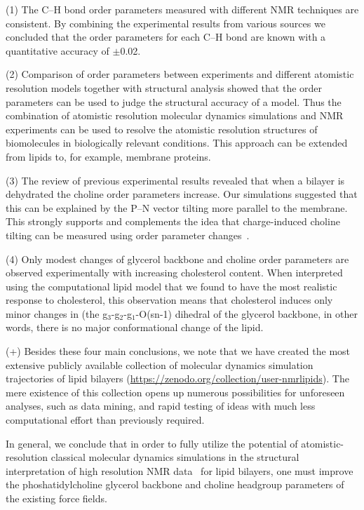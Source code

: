 \documentclass[journal=jacsat,manuscript=article]{achemso}
\begin{document}
(1) The C--H bond order parameters measured with different NMR techniques are consistent.
By combining the experimental results from various sources we concluded
that the order parameters for each C--H bond are known with a quantitative accuracy of $\pm$0.02.

(2) Comparison of order parameters between experiments and different atomistic resolution models 
together with structural analysis showed that the order parameters can be used
to judge the structural accuracy of a model. Thus the combination of atomistic resolution 
molecular dynamics simulations and NMR experiments can be used to resolve the atomistic resolution
structures of biomolecules in biologically relevant conditions. 
This approach can be extended from lipids to, for example, membrane proteins.

(3) The review of previous experimental results revealed that when a bilayer is dehydrated the 
choline order parameters increase. Our simulations suggested that
this can be explained by the P--N vector tilting more parallel to the membrane. 
This strongly supports and complements the idea that charge-induced choline tilting
can be measured using order parameter changes~\cite{ionpaper,scherer89}.

(4) Only modest changes of glycerol backbone and choline order parameters are observed experimentally with increasing cholesterol content.
When interpreted using the computational lipid model that we found to have the most realistic response to cholesterol,
this observation means that cholesterol induces only minor changes in (the g$_3$-g$_2$-g$_1$-O(sn-1)
dihedral of the glycerol backbone, in other words, there is no major conformational change of the lipid.

(+) Besides these four main conclusions, we note that we have created the most extensive
publicly available collection of molecular dynamics simulation trajectories of lipid bilayers
(\url{https://zenodo.org/collection/user-nmrlipids}). The mere existence of
this collection opens up numerous possibilities for unforeseen analyses, such as data mining,
and rapid testing of ideas with
much less computational effort than previously required.

In general, we conclude that in order to fully utilize the potential of atomistic-resolution classical molecular dynamics simulations
in the structural interpretation of high resolution NMR data~\cite{ferreira14} for lipid bilayers, one must  
improve the phoshatidylcholine glycerol backbone and choline headgroup parameters of the existing force fields.
\end{document}
